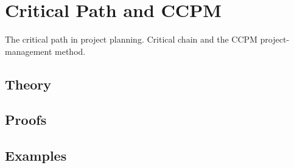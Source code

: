 
\section{Critical Path and CCPM}
\label{sec:2.6.05-critical-path-ccpm}

\begin{ticket}
The critical path in project planning. Critical chain and the CCPM project-management method.
\end{ticket}

\subsection*{Theory}

\subsection*{Proofs}

\subsection*{Examples}
